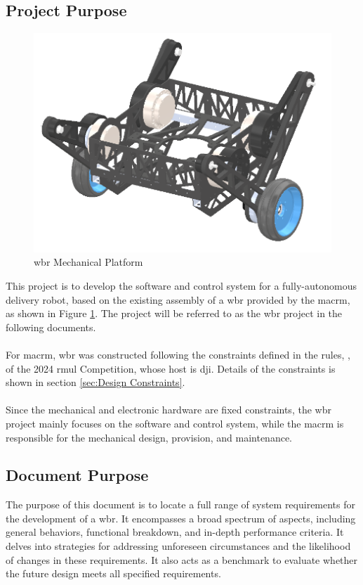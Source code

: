 \documentclass[12pt]{article}
\begin{document}
\subsection{Project Purpose} \label{sec:Project Purpose}
\begin{figure}[H]
    \centering
    \includegraphics[scale=0.7]{../Mechanical Platform.png}
    \caption{\acrshort{wbr} Mechanical Platform}
    \label{fig:Mechanical Platform}
\end{figure}
This project is to develop the software and control system for a fully-autonomous delivery robot, based on the existing assembly of a \acrfull{wbr} provided by the \acrfull{macrm}, as shown in Figure \ref{fig:Mechanical Platform}. The project will be referred to as the \acrshort{wbr} project in the following documents.\\\\
For \acrshort{macrm}, \acrshort{wbr} was constructed following the constraints defined in the rules, \citet{RmuBuildSpecs2024}, of the 2024 \acrfull{rmul} Competition, whose host is \acrfull{dji}. Details of the constraints is shown in section \ref{sec:Design Constraints}.\\\\
Since the mechanical and electronic hardware are fixed constraints, the \acrshort{wbr} project mainly focuses on the software and control system, while the \acrshort{macrm} is responsible for the mechanical design, provision, and maintenance.
\subsection{Document Purpose}
The purpose of this document is to locate a full range of system requirements for the development of a \acrshort{wbr}. It encompasses a broad spectrum of aspects, including general behaviors, functional breakdown, and in-depth performance criteria. It delves into strategies for addressing unforeseen circumstances and the likelihood of changes in these requirements. It also acts as a benchmark to evaluate whether the future design meets all specified requirements.
\end{document}
